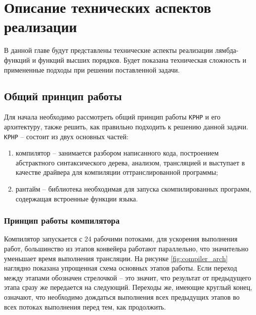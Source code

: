 
\chapter{Описание технических аспектов реализации}
В данной главе будут представлены технические аспекты реализации лямбда-функций и функций высших порядков.
Будет показана техническая сложность и примененные подходы при решении поставленной задачи.

\section{Общий принцип работы}
Для начала необходимо рассмотреть общий принцип работы \verb|KPHP| и его архитектуру, также решить, как правильно подходить к решению данной задачи.
\verb|KPHP| -- состоит из двух основных частей:
\begin{enumerate}
\item компилятор -- занимается разбором написанного кода, построением абстрактного синтаксического дерева, анализом, трансляцией и выступает в качестве драйвера для компиляции оттранслированной программы;
\item рантайм -- библиотека необходимая для запуска скомпилированных программ, содержащая встроенные функции языка.
\end{enumerate}

\subsection{Принцип работы компилятора}
Компилятор запускается с 24 рабочими потоками, для ускорения выполнения работ, большинство из этапов конвейера работают параллельно, что значительно уменьшает время выполнения трансляции.
На рисунке \ref{fig:compiler_arch} наглядно показана упрощенная схема основных этапов работы.
Если переход между этапами обозначен стрелочкой -- это значит, что результат от предыдущего этапа сразу же передается на следующий.
Переходы же, имеющие круглый конец, означают, что необходимо дождаться выполнения всех предыдущих этапов во всех потоках выполнения перед тем, как продолжить.

